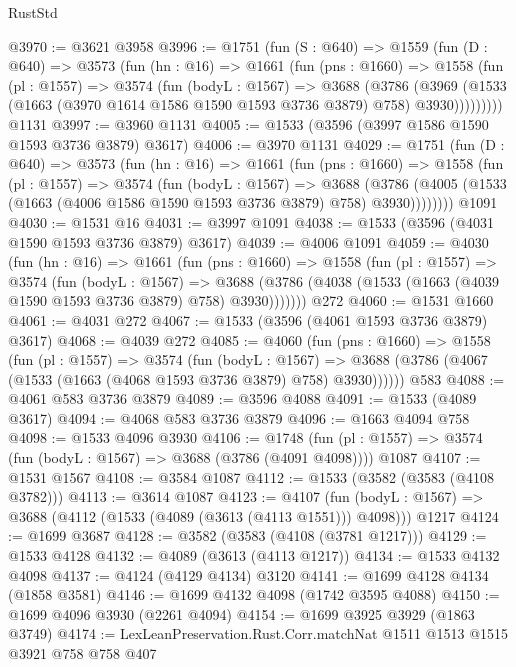 \begin{lexlean}{RustStd}
\begin{coremodule}
@3970 := @3621 @3958
@3996 := @1751
    (fun (S : @640) =>
    @1559
      (fun (D : @640) =>
      @3573
        (fun (hn : @16) =>
        @1661
          (fun (pns : @1660) =>
          @1558
            (fun (pl : @1557) =>
            @3574
              (fun (bodyL : @1567) =>
              @3688
                (@3786
                  (@3969
                    (@1533 (@1663 (@3970 @1614 @1586 @1590 @1593 @3736 @3879) @758) @3930)))))))))
    @1131
@3997 := @3960 @1131
@4005 := @1533 (@3596 (@3997 @1586 @1590 @1593 @3736 @3879) @3617)
@4006 := @3970 @1131
@4029 := @1751
    (fun (D : @640) =>
    @3573
      (fun (hn : @16) =>
      @1661
        (fun (pns : @1660) =>
        @1558
          (fun (pl : @1557) =>
          @3574
            (fun (bodyL : @1567) =>
            @3688
              (@3786 (@4005 (@1533 (@1663 (@4006 @1586 @1590 @1593 @3736 @3879) @758) @3930))))))))
    @1091
@4030 := @1531 @16
@4031 := @3997 @1091
@4038 := @1533 (@3596 (@4031 @1590 @1593 @3736 @3879) @3617)
@4039 := @4006 @1091
@4059 := @4030
    (fun (hn : @16) =>
    @1661
      (fun (pns : @1660) =>
      @1558
        (fun (pl : @1557) =>
        @3574
          (fun (bodyL : @1567) =>
          @3688 (@3786 (@4038 (@1533 (@1663 (@4039 @1590 @1593 @3736 @3879) @758) @3930)))))))
    @272
@4060 := @1531 @1660
@4061 := @4031 @272
@4067 := @1533 (@3596 (@4061 @1593 @3736 @3879) @3617)
@4068 := @4039 @272
@4085 := @4060
    (fun (pns : @1660) =>
    @1558
      (fun (pl : @1557) =>
      @3574
        (fun (bodyL : @1567) =>
        @3688 (@3786 (@4067 (@1533 (@1663 (@4068 @1593 @3736 @3879) @758) @3930))))))
    @583
@4088 := @4061 @583 @3736 @3879
@4089 := @3596 @4088
@4091 := @1533 (@4089 @3617)
@4094 := @4068 @583 @3736 @3879
@4096 := @1663 @4094 @758
@4098 := @1533 @4096 @3930
@4106 := @1748
    (fun (pl : @1557) => @3574 (fun (bodyL : @1567) => @3688 (@3786 (@4091 @4098))))
    @1087
@4107 := @1531 @1567
@4108 := @3584 @1087
@4112 := @1533 (@3582 (@3583 (@4108 @3782)))
@4113 := @3614 @1087
@4123 := @4107
    (fun (bodyL : @1567) => @3688 (@4112 (@1533 (@4089 (@3613 (@4113 @1551))) @4098)))
    @1217
@4124 := @1699 @3687
@4128 := @3582 (@3583 (@4108 (@3781 @1217)))
@4129 := @1533 @4128
@4132 := @4089 (@3613 (@4113 @1217))
@4134 := @1533 @4132 @4098
@4137 := @4124 (@4129 @4134) @3120
@4141 := @1699 @4128 @4134 (@1858 @3581)
@4146 := @1699 @4132 @4098 (@1742 @3595 @4088)
@4150 := @1699 @4096 @3930 (@2261 @4094)
@4154 := @1699 @3925 @3929 (@1863 @3749)
@4174 := LexLeanPreservation.Rust.Corr.matchNat
    @1511
    @1513
    @1515
    @3921
    @758
    @758
    @407

\end{coremodule}
\end{lexlean}
